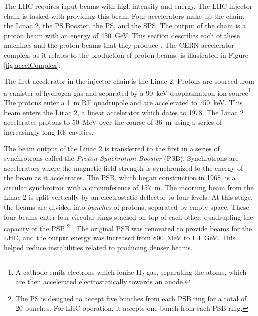 The LHC requires input beams with high intensity and energy.
The LHC injector chain is tasked with providing this beam.
Four accelerators make up the chain: the Linac 2, the PS Booster, the PS, and the SPS.
The output of the chain is a proton beam with an energy of 450~GeV.
This section describes each of these machines and the proton beams that they produce \cite{schindl}.
The CERN accelerator complex, as it relates to the production of proton beams, is illustrated in Figure \ref{fig:accelComplex}.

The first accelerator in the injector chain is the Linac 2.
Protons are sourced from a canister of hydrogen gas and separated by a 90~keV duoplasmatron ion source\footnote{A cathode emits electrons which ionize H$_2$ gas, separating the atoms, which are then accelerated electrostatically towards an anode.}.
The protons enter a 1~m RF quadrupole and are accelerated to 750~keV.
This beam enters the Linac 2, a linear accelerator which dates to 1978.
The Linac 2 accelerates protons to 50~MeV over the course of 36~m using a series of increasingly long RF cavities.

The beam output of the Linac 2 is transferred to the first in a series of synchrotrons called the \emph{Proton Synchrotron Booster} (PSB).
Synchrotrons are accelerators where the magnetic field strength is synchronized to the energy of the beam as it accelerates.
The PSB, which began construction in 1968, is a circular synchrotron with a circumference of 157~m.
The incoming beam from the Linac 2 is split vertically by an electrostatic deflector to four levels.
At this stage, the beams are divided into \emph{bunches} of protons, separated by empty space.
These four beams enter four circular rings stacked on top of each other, quadrupling the capacity of the PSB \footnote{The PS is designed to accept five bunches from each PSB ring for a total of 20 bunches. For LHC operation, it accepts one bunch from each PSB ring.} \cite{reich}.
The original PSB was renovated to provide beams for the LHC, and the output energy was increased from 800~MeV to 1.4~GeV. 
This helped reduce instabilities related to producing denser beams.
\cite{schindl}


